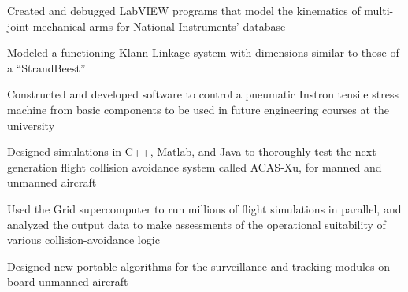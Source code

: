 \documentclass[letterpaper]{article}
\begin{document}
\begin{compactitem}
	\item Created and debugged LabVIEW programs that model the kinematics of multi-joint mechanical arms for National Instruments’ database\\
	\item Modeled a functioning Klann Linkage system with dimensions similar to those of a “StrandBeest”\\
	\item Constructed and developed software to control a pneumatic Instron tensile stress machine from basic components to be used in future engineering courses at the university
\end{compactitem}


\noindent{\Large\textbf {\\INDUSTRY}}

\begin{compactitem}
	\item Designed simulations in C++, Matlab, and Java to thoroughly test the next generation flight collision avoidance system called ACAS-Xu, for manned and unmanned aircraft\\
	\item Used the Grid supercomputer to run millions of flight simulations in parallel, and analyzed the output data to make assessments of the operational suitability of various collision-avoidance logic\\
	\item Designed new portable algorithms for the surveillance and tracking modules on board unmanned aircraft
\end{compactitem}
\end{document}
